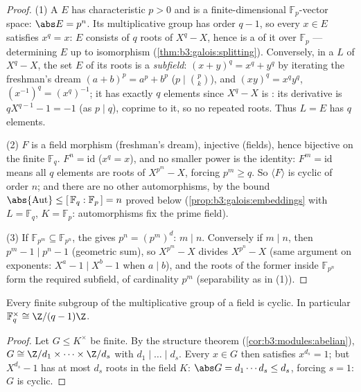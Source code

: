 \begin{proof}
(1) A  $E$ has characteristic $p > 0$ and is a
finite-dimensional $\mathbb F_p$-vector space: $\abs E = p^n$.
Its multiplicative group has order $q - 1$, so every $x \in E$
satisfies $x^q = x$: $E$ consists of $q$ roots of $X^q - X$,
hence is a  of it over $\mathbb F_p$ ---
determining $E$ up to isomorphism
(\cref{thm:b3:galois:splitting}). Conversely, in a  $L$ of $X^q - X$, the set $E$ of its roots is a
\emph{subfield}: $(x + y)^q = x^q + y^q$ by iterating the
freshman's dream $(a+b)^p = a^p + b^p$ ($p \mid \binom pk$), and
$(xy)^q = x^qy^q$, $(x^{-1})^q = (x^q)^{-1}$; it has exactly $q$
elements since $X^q - X$ is : its derivative is
$qX^{q-1} - 1 = -1$ (as $p \mid q$), coprime to it, so no
repeated roots. Thus $L = E$ has $q$ elements.

(2) $F$ is a field morphism (freshman's dream), injective
(fields), hence bijective on the finite $\mathbb F_q$. $F^n =
\mathrm{id}$ ($x^q = x$), and no smaller power is the identity:
$F^m = \mathrm{id}$ means all $q$ elements are roots of
$X^{p^m} - X$, forcing $p^m \geq q$. So $\langle F\rangle$ is
cyclic of order $n$; and there are no other automorphisms, by
the bound $\abs{\operatorname{Aut}} \leq [\,\mathbb F_q :
\mathbb F_p\,] = n$ proved below
(\cref{prop:b3:galois:embeddings} with $L = \mathbb F_q$, $K =
\mathbb F_p$: automorphisms fix the prime field).

(3) If $\mathbb F_{p^m} \subseteq \mathbb F_{p^n}$, the 
gives $p^n = (p^m)^d$: $m \mid n$. Conversely if $m \mid n$, then
$p^m - 1 \mid p^n - 1$ (geometric sum), so $X^{p^m} - X$ divides
$X^{p^n} - X$ (same argument on exponents: $X^{a} - 1 \mid X^{b}
- 1$ when $a \mid b$), and the roots of the former inside
$\mathbb F_{p^n}$ form the required subfield, of cardinality
$p^m$ (separability as in (1)).
\end{proof}

\begin{theorem}[Cyclicity]\label{thm:b3:galois:cyclic}
Every finite subgroup of the multiplicative group of a field is
cyclic. In particular $\mathbb F_q^\times \cong
\Z/(q-1)\Z$.
\end{theorem}

\begin{proof}
Let $G \leq K^\times$ be finite. By the structure theorem
(\cref{cor:b3:modules:abelian}), $G \cong \Z/d_1 \times \dots
\times \Z/d_s$ with $d_1 \mid \dots \mid d_s$. Every $x \in G$
then satisfies $x^{d_s} = 1$; but $X^{d_s} - 1$ has at most
$d_s$ roots in the field $K$: $\abs G = d_1\cdots d_s \leq d_s$,
forcing $s = 1$: $G$ is cyclic.
\end{proof}

